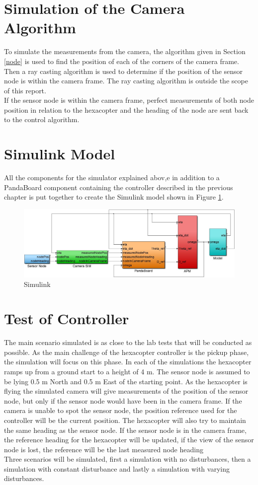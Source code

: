 \section{Simulation of the Camera Algorithm}
To simulate the measurements from the camera, the algorithm given in Section \ref{node} is used to find the position of each of the corners of the camera frame. Then a ray casting algorithm is used to determine if the position of the sensor node is within the camera frame. The ray casting algorithm is outside the scope of this report.\\
\newline
If the sensor node is within the camera frame, perfect measurements of both node position in relation to the hexacopter and the heading of the node are sent back to the control algorithm.
\section{Simulink Model}
All the components for the simulator explained abov,e in addition to a PandaBoard component containing the controller described in the previous chapter is put together to create the Simulink model shown in Figure  \ref{simulink}.
\begin{figure}[H]
\centering
\includegraphics[width = 18cm]{fig/simulink.jpg}
\caption{Simulink}
\label{simulink}
\end{figure}
\section{Test of Controller}
The main scenario simulated is as close to the lab tests that will be conducted as possible. As the main challenge of the hexacopter controller is the pickup phase, the simulation will focus on this phase. In each of the simulations the hexacopter ramps up from a ground start to a height of 4 m. The sensor node is assumed to be lying 0.5 m North and 0.5 m East of the starting point. As the  hexacopter is flying the simulated camera will give measurements of the position of the sensor node, but only if the sensor node would have been in the camera frame. If the camera is unable to spot the sensor node, the position reference used for the controller will be the current position. The hexacopter will also try to maintain the same heading as the sensor node. If the sensor node is in the camera frame, the reference heading for the hexacopter will be updated, if the view of the sensor node is lost, the reference will be the last measured node heading\\
\newline
Three scenarios will be simulated, first a simulation with no disturbances, then a simulation with constant disturbance and lastly a simulation with varying disturbances.
